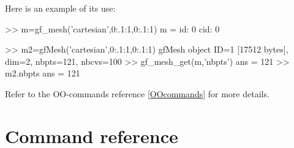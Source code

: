 Here is an example of its use:
\begin{matlab}
>> m=gf_mesh('cartesian',0:.1:1,0:.1:1) 
m = 
     id: 0
    cid: 0

>> m2=gfMesh('cartesian',0:.1:1,0:.1:1)
gfMesh object ID=1 [17512 bytes], dim=2, nbpts=121, nbcvs=100
>> gf_mesh_get(m,'nbpts')
ans =
   121
>> m2.nbpts
ans =
   121
\end{matlab}
Refer to the OO-commands reference \ref{OOcommands} for more details.

\section{Command reference}
